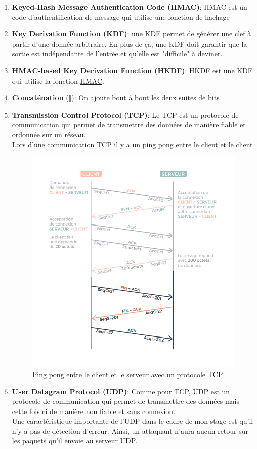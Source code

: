 \documentclass[a4paper, 12pt]{article}
\begin{document}
\begin{enumerate}
\item \textbf{Keyed-Hash Message Authentication Code (HMAC)}\label{HMAC}: HMAC est un code d'authentification de message qui utilise une fonction de hachage
	\item \textbf{Key Derivation Function (KDF)}\label{KDF}: une KDF permet de générer une clef à partir d'une donnée arbitraire. En plus de ça, une KDF doit garantir que la sortie est indépendante de l'entrée et qu'elle est "difficile" à deviner. 
	\item \textbf{HMAC-based Key Derivation Function (HKDF)}\label{HKDF}: HKDF est une \hyperref[KDF]{KDF} qui utilise la fonction \hyperref[HMAC]{HMAC}.

	\item \textbf{Concaténation} ($\Vert$)\label{concat}: On ajoute bout à bout les deux suites de bits
	\item \textbf{Transmission Control Protocol (TCP)}\label{TCP}: Le TCP est un protocole de communication qui permet de transmettre des données de manière fiable et ordonnée sur un réseau. \\
Lors d'une communication TCP il y a un ping pong entre le client et le client
\begin{figure}[h]
	\centering
	\includegraphics[width=.7\textwidth]{img/TCP.png}
	\caption{Ping pong entre le client et le serveur avec un protocole TCP}
	\label{pingpongtcp}
\end{figure}


\item \textbf{User Datagram Protocol (UDP)}\label{UDP}: Comme pour \hyperref[TCP]{TCP}, UDP est un protocole de communication qui permet de transmettre des données mais cette fois ci de manière non fiable et sans connexion. \\
Une caractéristique importante de l'UDP dans le cadre de mon stage est qu'il n'y a pas de détection d'erreur. Ainsi, un attaquant n'aura aucun retour sur les paquets qu'il envoie au serveur UDP.
\end{enumerate}
\newpage
\end{document}
